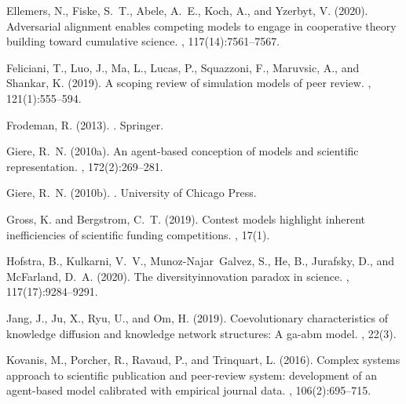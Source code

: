 \documentclass[utf8,11pt]{article}
\begin{document}
\begin{thebibliography}{}
Ellemers, N., Fiske, S.~T., Abele, A.~E., Koch, A., and Yzerbyt, V. (2020).
\newblock Adversarial alignment enables competing models to engage in
  cooperative theory building toward cumulative science.
,
  117(14):7561--7567.

Feliciani, T., Luo, J., Ma, L., Lucas, P., Squazzoni, F., Maruvsic, A., and
  Shankar, K. (2019).
\newblock A scoping review of simulation models of peer review.
, 121(1):555--594.

Frodeman, R. (2013).
.
\newblock Springer.

Giere, R.~N. (2010a).
\newblock An agent-based conception of models and scientific representation.
, 172(2):269--281.

Giere, R.~N. (2010b).
.
\newblock University of Chicago Press.

Gross, K. and Bergstrom, C.~T. (2019).
\newblock Contest models highlight inherent inefficiencies of scientific
  funding competitions.
, 17(1).

Hofstra, B., Kulkarni, V.~V., Munoz-Najar~Galvez, S., He, B., Jurafsky, D., and
  McFarland, D.~A. (2020).
\newblock The diversity{\textendash}innovation paradox in science.
,
  117(17):9284--9291.

Jang, J., Ju, X., Ryu, U., and Om, H. (2019).
\newblock Coevolutionary characteristics of knowledge diffusion and knowledge
  network structures: A ga-abm model.
, 22(3).

Kovanis, M., Porcher, R., Ravaud, P., and Trinquart, L. (2016).
\newblock Complex systems approach to scientific publication and peer-review
  system: development of an agent-based model calibrated with empirical journal
  data.
, 106(2):695--715.


\end{thebibliography}
\end{document}
